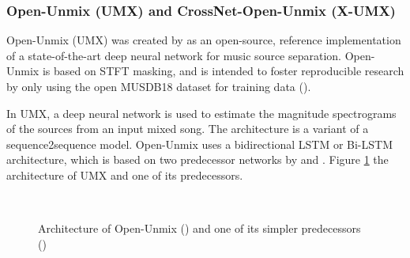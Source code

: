 \documentclass[report.tex]{subfiles}
\begin{document}
\newpagefill

\subsubsection{Open-Unmix (UMX) and CrossNet-Open-Unmix (X-UMX)}
\label{sec:umx}

Open-Unmix (UMX) was created by \textcite{umx} as an open-source, reference implementation of a state-of-the-art deep neural network for music source separation. Open-Unmix is based on STFT masking, and is intended to foster reproducible research by only using the open MUSDB18 dataset for training data (\cite{musdb18, musdb18hq}).

In UMX, a deep neural network is used to estimate the magnitude spectrograms of the sources from an input mixed song. The architecture is a variant of a sequence2sequence model. Open-Unmix uses a bidirectional LSTM or Bi-LSTM architecture, which is based on two predecessor networks by \textcite{umxorig1} and \textcite{umxorig2}. Figure \ref{fig:umxes} the architecture of UMX and one of its predecessors.

\begin{figure}[ht]
	\centering
	\\
	\caption{Architecture of Open-Unmix (\cite{umx}) and one of its simpler predecessors (\cite{umxorig1})}
	\label{fig:umxes}
\end{figure}
\end{document}
